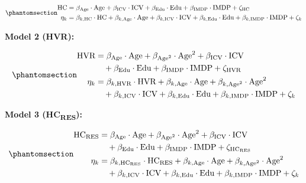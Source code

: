 \documentclass[
]{article}
\begin{document}
\begin{equation}\phantomsection\label{eq-sem-hc}{\begin{aligned}
\text{HC} &= \beta_{\text{Age}} \cdot \text{Age} + \beta_{\text{ICV}} \cdot \text{ICV} + \beta_{\text{Edu}} \cdot \text{Edu} + \beta_{\text{IMDP}} \cdot \text{IMDP} + \zeta_{\text{HC}} \\
\eta_k &= \beta_{k,\text{HC}} \cdot \text{HC} + \beta_{k,\text{Age}} \cdot \text{Age} + \beta_{k,\text{ICV}} \cdot \text{ICV} + \beta_{k,\text{Edu}} \cdot \text{Edu} + \beta_{k,\text{IMDP}} \cdot \text{IMDP} + \zeta_k
\end{aligned}}\end{equation}

\textbf{Model 2 (HVR):}

\begin{equation}\phantomsection\label{eq-sem-hvr}{\begin{aligned}
\text{HVR} &= \beta_{\text{Age}} \cdot \text{Age} + \beta_{\text{Age}^2} \cdot \text{Age}^2 + \beta_{\text{ICV}} \cdot \text{ICV} \\
  &\quad + \beta_{\text{Edu}} \cdot \text{Edu} + \beta_{\text{IMDP}} \cdot \text{IMDP} + \zeta_{\text{HVR}} \\
\eta_k &= \beta_{k,\text{HVR}} \cdot \text{HVR} + \beta_{k,\text{Age}} \cdot \text{Age} + \beta_{k,\text{Age}^2} \cdot \text{Age}^2 \\
  &\quad + \beta_{k,\text{ICV}} \cdot \text{ICV} + \beta_{k,\text{Edu}} \cdot \text{Edu} + \beta_{k,\text{IMDP}} \cdot \text{IMDP} + \zeta_k
\end{aligned}}\end{equation}

\textbf{Model 3 (HC\textsubscript{RES}):}

\begin{equation}\phantomsection\label{eq-sem-hcres}{\begin{aligned}
\text{HC}_{\text{RES}} &= \beta_{\text{Age}} \cdot \text{Age} + \beta_{\text{Age}^2} \cdot \text{Age}^2 + \beta_{\text{ICV}} \cdot \text{ICV} \\
  &\quad + \beta_{\text{Edu}} \cdot \text{Edu} + \beta_{\text{IMDP}} \cdot \text{IMDP} + \zeta_{\text{HC}_{\text{RES}}} \\
\eta_k &= \beta_{k,\text{HC}_{\text{RES}}} \cdot \text{HC}_{\text{RES}} + \beta_{k,\text{Age}} \cdot \text{Age} + \beta_{k,\text{Age}^2} \cdot \text{Age}^2 \\
  &\quad + \beta_{k,\text{ICV}} \cdot \text{ICV} + \beta_{k,\text{Edu}} \cdot \text{Edu} + \beta_{k,\text{IMDP}} \cdot \text{IMDP} + \zeta_k
\end{aligned}}\end{equation}
\end{document}
